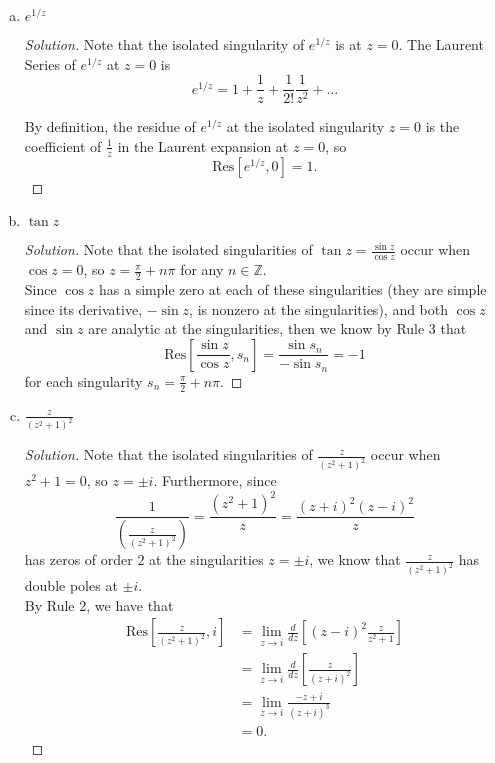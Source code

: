 \documentclass[11pt]{article}
\newenvironment{solution}
  {\renewcommand\qedsymbol{$\blacksquare$}\begin{proof}[Solution]}
  {\end{proof}}
\theoremstyle{definition}
\begin{document}
\begin{enumerate}[a)]
	\item $e^{1/z}$
	
	\begin{solution}
		Note that the isolated singularity of $e^{1/z}$ is at $z=0$. The Laurent Series of $e^{1/z}$ at $z=0$ is 
		\[ e^{1/z} = 1 + \frac{1}{z} + \frac{1}{2!}\frac{1}{z^2} + \dots \]

		By definition, the residue of $e^{1/z}$ at the isolated singularity $z=0$ is the coefficient of $\frac{1}{z}$ in the Laurent expansion at $z=0$, so \[ \mathrm{Res}\left[ e^{1/z}, 0\right] = \boxed{1}.\]
	\end{solution}

	\item $\tan z$
	
	\begin{solution}
		Note that the isolated singularities of $\tan z = \frac{\sin z}{\cos z}$ occur when $\cos z = 0$, so $z=\frac{\pi}{2} + n\pi$ for any $n \in \mathbb{Z}$. \\

		Since $\cos z$ has a simple zero at each of these singularities (they are simple since its derivative, $-\sin z$, is nonzero at the singularities), and both $\cos z$ and $\sin z$ are analytic at the singularities, then we know by Rule 3 that
		\[ \mathrm{Res}\left[ \frac{\sin z}{\cos z}, s_n\right] = \frac{\sin s_n}{-\sin s_n} = \boxed{-1}\] for each singularity $s_n = \frac{\pi}{2} + n\pi$.\end{solution}

	\item $\frac{z}{(z^2+1)^2}$
	
	\begin{solution}
	Note that the isolated singularities of $\frac{z}{(z^2+1)^2}$ occur when $z^2+1=0$, so $z = \pm i.$ Furthermore, since \[\frac{1}{\left(\frac{z}{(z^2+1)^2}\right)} = \frac{(z^2+1)^2}{z} = \frac{(z+i)^2(z-i)^2}{z} \]
	has zeros of order $2$ at the singularities $z = \pm i$, we know that $\frac{z}{(z^2+1)^2}$ has double poles at $\pm i$.  \\

	By Rule 2, we have that
	\begin{align*} \mathrm{Res}\left[\frac{z}{(z^2+1)^2}, i\right] &= \lim\limits_{z \rightarrow i} \frac{d}{dz} \left[ (z-i)^2 \frac{z}{z^2+1}\right] \\
	&= \lim\limits_{z \rightarrow i} \frac{d}{dz} \left[ \frac{z}{(z+i)^2}\right] \\
	&= \lim\limits_{z \rightarrow i} \frac{-z + i}{(z+i)^3} \\
	&= 0.\end{align*}


\end{solution}
\end{enumerate}
\end{document}
